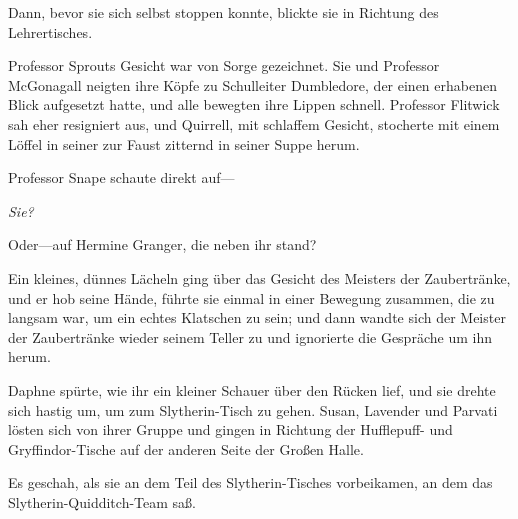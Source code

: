 Dann, bevor sie sich selbst stoppen konnte, blickte sie in Richtung des Lehrertisches.

Professor Sprouts Gesicht war von Sorge gezeichnet. Sie und Professor McGonagall neigten ihre Köpfe zu Schulleiter Dumbledore, der einen erhabenen Blick aufgesetzt hatte, und alle bewegten ihre Lippen schnell. Professor Flitwick sah eher resigniert aus, und Quirrell, mit schlaffem Gesicht, stocherte mit einem Löffel in seiner zur Faust zitternd in seiner Suppe herum.

Professor Snape schaute direkt auf—

\emph{Sie?}

Oder—auf Hermine Granger, die neben ihr stand?

Ein kleines, dünnes Lächeln ging über das Gesicht des Meisters der Zaubertränke, und er hob seine Hände, führte sie einmal in einer Bewegung zusammen, die zu langsam war, um ein echtes Klatschen zu sein; und dann wandte sich der Meister der Zaubertränke wieder seinem Teller zu und ignorierte die Gespräche um ihn herum.

Daphne spürte, wie ihr ein kleiner Schauer über den Rücken lief, und sie drehte sich hastig um, um zum Slytherin-Tisch zu gehen. Susan, Lavender und Parvati lösten sich von ihrer Gruppe und gingen in Richtung der Hufflepuff- und Gryffindor-Tische auf der anderen Seite der Großen Halle.

Es geschah, als sie an dem Teil des Slytherin-Tisches vorbeikamen, an dem das Slytherin-Quidditch-Team saß.

